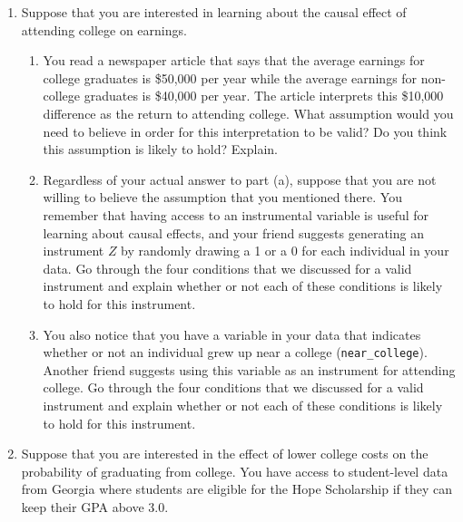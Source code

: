 \documentclass[
  letterpaper,
  DIV=11,
  numbers=noendperiod]{scrreprt}
\begin{document}
\begin{enumerate}
\begin{enumerate}
    you think this assumption is likely to hold? Explain.
  \item
    Regardless of your answer to part (f), explain how to estimate the
    ATT of participating in a union on earnings under the assumption in
    part (f) using regression adjustment and then using a single
    regression.
  \item
    Given the setup with two periods of panel data, is it possible to
    conduct a placebo test for lagged outcome unconfoundedness or
    difference-in-differences? Does your answer change if you had access
    to three periods of panel data? Explain.
  \end{enumerate}
\item
  Suppose that you are interested in learning about the causal effect of
  attending college on earnings.

  \begin{enumerate}
  \def\labelenumii{\alph{enumii})}
  \item
    You read a newspaper article that says that the average earnings for
    college graduates is \$50,000 per year while the average earnings
    for non-college graduates is \$40,000 per year. The article
    interprets this \$10,000 difference as the return to attending
    college. What assumption would you need to believe in order for this
    interpretation to be valid? Do you think this assumption is likely
    to hold? Explain.
  \item
    Regardless of your actual answer to part (a), suppose that you are
    not willing to believe the assumption that you mentioned there. You
    remember that having access to an instrumental variable is useful
    for learning about causal effects, and your friend suggests
    generating an instrument \(Z\) by randomly drawing a 1 or a 0 for
    each individual in your data. Go through the four conditions that we
    discussed for a valid instrument and explain whether or not each of
    these conditions is likely to hold for this instrument.
  \item
    You also notice that you have a variable in your data that indicates
    whether or not an individual grew up near a college
    (\texttt{near\_college}). Another friend suggests using this
    variable as an instrument for attending college. Go through the four
    conditions that we discussed for a valid instrument and explain
    whether or not each of these conditions is likely to hold for this
    instrument.
  \end{enumerate}
\item
  Suppose that you are interested in the effect of lower college costs
  on the probability of graduating from college. You have access to
  student-level data from Georgia where students are eligible for the
  Hope Scholarship if they can keep their GPA above 3.0.


\end{enumerate}
\end{document}
